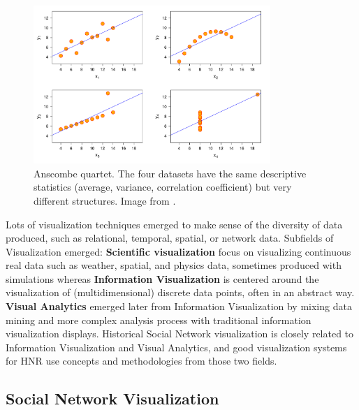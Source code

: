 \begin{figure}
    \centering %
    \includegraphics[width=0.8\textwidth]{static/figures/RelatedWork/Anscombe.pdf}
    \caption{Anscombe quartet. The four datasets have the same descriptive statistics (average, variance, correlation coefficient) but very different structures. Image from \cite{anscombeGraphsStatisticalAnalysis1973}.}
    \label{fig:anscombe-quartet}
\end{figure}


Lots of visualization techniques emerged to make sense of the diversity of data produced, such as relational, temporal, spatial, or network data.
Subfields of Visualization emerged: \textbf{Scientific visualization} focus on visualizing continuous real data such as weather, spatial, and physics data, sometimes produced with simulations whereas \textbf{Information Visualization} is centered around the visualization of (multidimensional) discrete data points, often in an abstract way. \textbf{Visual Analytics} emerged later from Information Visualization by mixing data mining and more complex analysis process with traditional information visualization displays.
Historical Social Network visualization is closely related to Information Visualization and Visual Analytics, and good visualization systems for HNR use concepts and methodologies from those two fields.


\subsection{Social Network Visualization}

